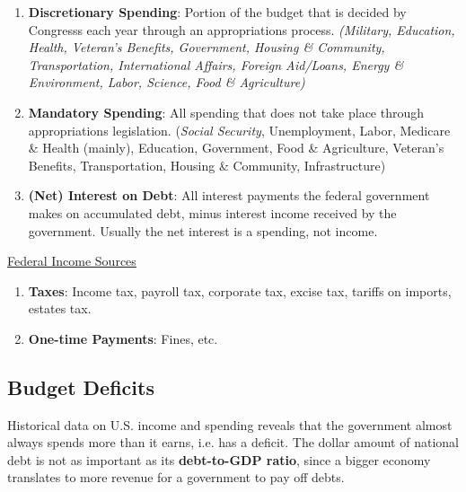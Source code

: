 \documentclass{article}
\begin{document}
    \begin{enumerate}
      \item \textbf{Discretionary Spending}: Portion of the budget that is decided by Congresss each year through an appropriations process. \textit{(Military, Education, Health, Veteran's Benefits, Government, Housing \& Community, Transportation, International Affairs, Foreign Aid/Loans, Energy \& Environment, Labor, Science, Food \& Agriculture)}
      \item \textbf{Mandatory Spending}: All spending that does not take place through appropriations legislation. (\textit{Social Security}, Unemployment, Labor, Medicare \& Health (mainly), Education, Government, Food \& Agriculture, Veteran's Benefits, Transportation, Housing \& Community, Infrastructure)
      \item \textbf{(Net) Interest on Debt}: All interest payments the federal government makes on accumulated debt, minus interest income received by the government. Usually the net interest is a spending, not income.
    \end{enumerate}

    \underline{Federal Income Sources}
    \begin{enumerate}
    \item \textbf{Taxes}: Income tax, payroll tax, corporate tax, excise tax, tariffs on imports, estates tax.
    \item \textbf{One-time Payments}: Fines, etc.
    \end{enumerate}

  \subsection{Budget Deficits}

    Historical data on U.S. income and spending reveals that the government almost always spends more than it earns, i.e. has a deficit. The dollar amount of national debt is not as important as its \textbf{debt-to-GDP ratio}, since a bigger economy translates to more revenue for a government to pay off debts.
\end{document}
